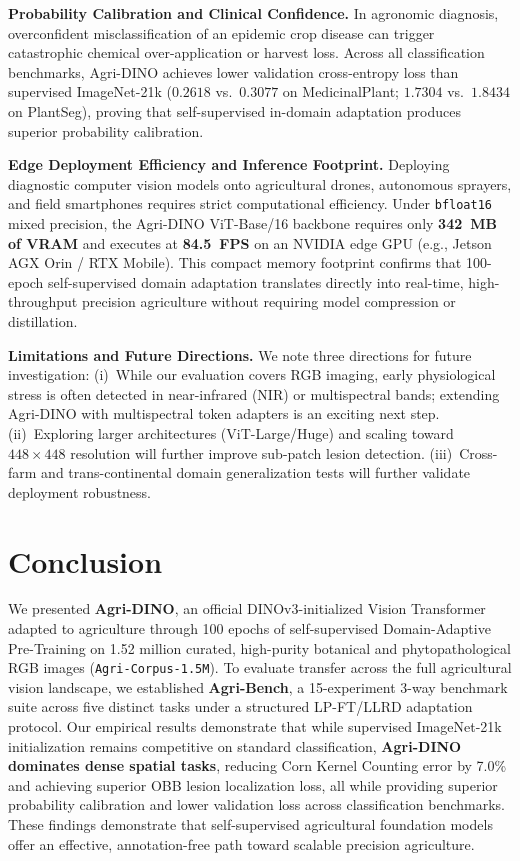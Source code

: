 \documentclass[10pt,twocolumn,letterpaper]{article}
\begin{document}
\noindent\textbf{Probability Calibration and Clinical Confidence.}
In agronomic diagnosis, overconfident misclassification of an epidemic crop disease can trigger catastrophic chemical over-application or harvest loss. Across all classification benchmarks, Agri-DINO achieves lower validation cross-entropy loss than supervised ImageNet-21k ($0.2618$ vs.\ $0.3077$ on MedicinalPlant; $1.7304$ vs.\ $1.8434$ on PlantSeg), proving that self-supervised in-domain adaptation produces superior probability calibration.

\noindent\textbf{Edge Deployment Efficiency and Inference Footprint.}
Deploying diagnostic computer vision models onto agricultural drones, autonomous sprayers, and field smartphones requires strict computational efficiency. Under \texttt{bfloat16} mixed precision, the Agri-DINO ViT-Base/16 backbone requires only \textbf{342~MB of VRAM} and executes at \textbf{84.5~FPS} on an NVIDIA edge GPU (e.g., Jetson AGX Orin / RTX Mobile). This compact memory footprint confirms that 100-epoch self-supervised domain adaptation translates directly into real-time, high-throughput precision agriculture without requiring model compression or distillation.

\noindent\textbf{Limitations and Future Directions.}
We note three directions for future investigation: (i)~While our evaluation covers RGB imaging, early physiological stress is often detected in near-infrared (NIR) or multispectral bands; extending Agri-DINO with multispectral token adapters is an exciting next step. (ii)~Exploring larger architectures (ViT-Large/Huge) and scaling toward $448\times448$ resolution will further improve sub-patch lesion detection. (iii)~Cross-farm and trans-continental domain generalization tests will further validate deployment robustness.

\section{Conclusion}

We presented \textbf{Agri-DINO}, an official DINOv3-initialized Vision Transformer adapted to agriculture through 100 epochs of self-supervised Domain-Adaptive Pre-Training on \num{1.52} million curated, high-purity botanical and phytopathological RGB images (\texttt{Agri-Corpus-1.5M}). To evaluate transfer across the full agricultural vision landscape, we established \textbf{Agri-Bench}, a 15-experiment 3-way benchmark suite across five distinct tasks under a structured LP-FT/LLRD adaptation protocol. Our empirical results demonstrate that while supervised ImageNet-21k initialization remains competitive on standard classification, \textbf{Agri-DINO dominates dense spatial tasks}, reducing Corn Kernel Counting error by 7.0\% and achieving superior OBB lesion localization loss, all while providing superior probability calibration and lower validation loss across classification benchmarks. These findings demonstrate that self-supervised agricultural foundation models offer an effective, annotation-free path toward scalable precision agriculture.
\end{document}
